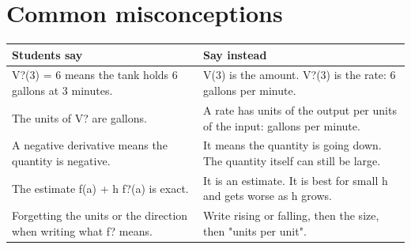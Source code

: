 \documentclass[11pt]{article}
\begin{document}
\section*{Common misconceptions}\begin{tabularx}{\textwidth}{@{}X X@{}}\toprule Students say & Say instead\\\midrule
V?(3) = 6 means the tank holds 6 gallons at 3 minutes. & V(3) is the amount. V?(3) is the rate: 6 gallons per minute.\\
The units of V? are gallons. & A rate has units of the output per units of the input: gallons per minute.\\
A negative derivative means the quantity is negative. & It means the quantity is going down. The quantity itself can still be large.\\
The estimate f(a) + h f?(a) is exact. & It is an estimate. It is best for small h and gets worse as h grows.\\
Forgetting the units or the direction when writing what f? means. & Write rising or falling, then the size, then "units per unit".\\
\bottomrule\end{tabularx}
\end{document}
